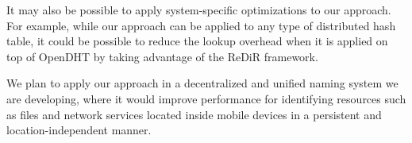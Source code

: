 \documentclass{article}
\begin{document}
It may also be possible to apply system-specific optimizations to our
approach.  For example, while our approach can be applied to any type
of distributed hash table, it could be possible to reduce the lookup
overhead when it is applied on top of OpenDHT by taking advantage of
the ReDiR framework.

We plan to apply our approach in a decentralized and unified naming
system we are developing, where it would improve performance for
identifying resources such as files and network services located
inside mobile devices in a persistent and location-independent manner.




\end{document}
